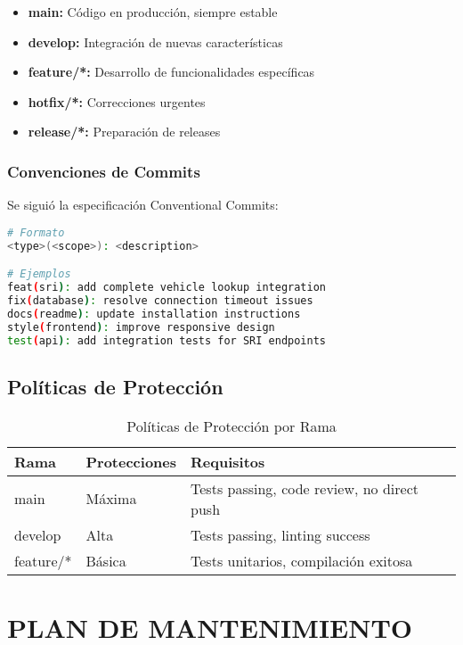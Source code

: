 \documentclass[12pt,a4paper]{article}
\begin{document}
\begin{itemize}
    \item \textbf{main:} Código en producción, siempre estable
    \item \textbf{develop:} Integración de nuevas características
    \item \textbf{feature/*:} Desarrollo de funcionalidades específicas
    \item \textbf{hotfix/*:} Correcciones urgentes
    \item \textbf{release/*:} Preparación de releases
\end{itemize}

\subsubsection{Convenciones de Commits}

Se siguió la especificación Conventional Commits:

\begin{lstlisting}[language=bash]
# Formato
<type>(<scope>): <description>

# Ejemplos
feat(sri): add complete vehicle lookup integration
fix(database): resolve connection timeout issues
docs(readme): update installation instructions
style(frontend): improve responsive design
test(api): add integration tests for SRI endpoints
\end{lstlisting}

\subsection{Políticas de Protección}

\begin{table}[h]
\centering
\begin{tabularx}{\textwidth}{|l|X|X|}
\hline
\textbf{Rama} & \textbf{Protecciones} & \textbf{Requisitos} \\
\hline
main & Máxima & Tests passing, code review, no direct push \\
\hline
develop & Alta & Tests passing, linting success \\
\hline
feature/* & Básica & Tests unitarios, compilación exitosa \\
\hline
\end{tabularx}
\caption{Políticas de Protección por Rama}
\end{table}

\section{PLAN DE MANTENIMIENTO}
\end{document}
